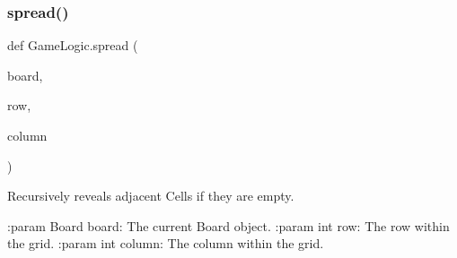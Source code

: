 \subsubsection{\texorpdfstring{spread()}{spread()}}
{\footnotesize\ttfamily def Game\+Logic.\+spread (\begin{DoxyParamCaption}\item[{}]{board,  }\item[{}]{row,  }\item[{}]{column }\end{DoxyParamCaption})}

\begin{DoxyVerb}Recursively reveals adjacent Cells if they are empty.

:param Board board: The current Board object.
:param int row: The row within the grid.
:param int column: The column within the grid.
\end{DoxyVerb}
 